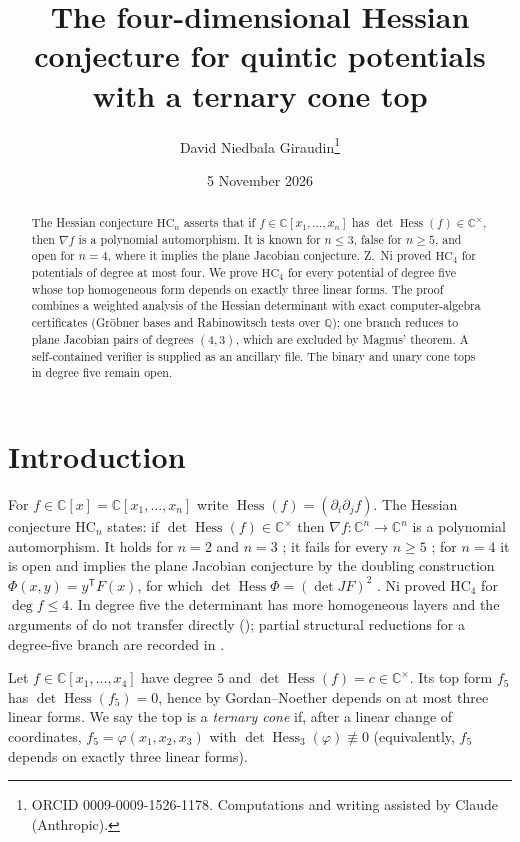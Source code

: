 \documentclass[11pt]{article}
\title{The four-dimensional Hessian conjecture for quintic potentials\\ with a ternary cone top}
\author{David Niedbala Giraudin\thanks{ORCID 0009-0009-1526-1178. Computations and writing assisted by Claude (Anthropic).}}
\date{5 November 2026}
\theoremstyle{remark}
\newcommand{\C}{\mathbb{C}}
\newcommand{\Hess}{\operatorname{Hess}}
\begin{document}
\maketitle

\begin{abstract}
The Hessian conjecture $\mathrm{HC}_n$ asserts that if $f\in\C[x_1,\dots,x_n]$ has $\det\Hess(f)\in\C^\times$, then $\nabla f$ is a polynomial automorphism. It is known for $n\le 3$, false for $n\ge 5$, and open for $n=4$, where it implies the plane Jacobian conjecture. Z.~Ni proved $\mathrm{HC}_4$ for potentials of degree at most four. We prove $\mathrm{HC}_4$ for every potential of degree five whose top homogeneous form depends on exactly three linear forms. The proof combines a weighted analysis of the Hessian determinant with exact computer-algebra certificates (Gr\"obner bases and Rabinowitsch tests over $\mathbb{Q}$); one branch reduces to plane Jacobian pairs of degrees $(4,3)$, which are excluded by Magnus' theorem. A self-contained verifier is supplied as an ancillary file. The binary and unary cone tops in degree five remain open.
\end{abstract}

\section{Introduction}
For $f\in\C[x]=\C[x_1,\dots,x_n]$ write $\Hess(f)=(\partial_i\partial_j f)$. The Hessian conjecture $\mathrm{HC}_n$ \cite{Meng06} states: if $\det\Hess(f)\in\C^\times$ then $\nabla f\colon\C^n\to\C^n$ is a polynomial automorphism. It holds for $n=2$ \cite{Dillen} and $n=3$ \cite{deBondt3}; it fails for every $n\ge5$ \cite{MengYang}; for $n=4$ it is open and implies the plane Jacobian conjecture by the doubling construction $\Phi(x,y)=y^{\mathsf T}F(x)$, for which $\det\Hess\Phi=(\det JF)^2$ \cite{MengYang,Ni}. Ni \cite{Ni} proved $\mathrm{HC}_4$ for $\deg f\le 4$. In degree five the determinant has more homogeneous layers and the arguments of \cite{Ni} do not transfer directly (\cite[\S8]{Ni}); partial structural reductions for a degree-five branch are recorded in \cite{EP}.

Let $f\in\C[x_1,\dots,x_4]$ have degree $5$ and $\det\Hess(f)=c\in\C^\times$. Its top form $f_5$ has $\det\Hess(f_5)=0$, hence by Gordan--Noether \cite{GN,deBondtQT} depends on at most three linear forms. We say the top is a \emph{ternary cone} if, after a linear change of coordinates, $f_5=\varphi(x_1,x_2,x_3)$ with $\det\Hess_3(\varphi)\not\equiv0$ (equivalently, $f_5$ depends on exactly three linear forms).
\end{document}
